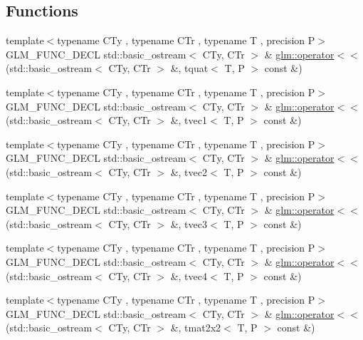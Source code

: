 \subsection*{Functions}
\begin{DoxyCompactItemize}
\item 
{\footnotesize template$<$typename C\+Ty , typename C\+Tr , typename T , precision P$>$ }\\G\+L\+M\+\_\+\+F\+U\+N\+C\+\_\+\+D\+E\+C\+L std\+::basic\+\_\+ostream$<$ C\+Ty, C\+Tr $>$ \& \hyperlink{group__gtx__io_ga038d37e8d7965dc7bfae5dc23e4140af}{glm\+::operator$<$$<$} (std\+::basic\+\_\+ostream$<$ C\+Ty, C\+Tr $>$ \&, tquat$<$ T, P $>$ const \&)
\item 
{\footnotesize template$<$typename C\+Ty , typename C\+Tr , typename T , precision P$>$ }\\G\+L\+M\+\_\+\+F\+U\+N\+C\+\_\+\+D\+E\+C\+L std\+::basic\+\_\+ostream$<$ C\+Ty, C\+Tr $>$ \& \hyperlink{group__gtx__io_ga171289d1671b75e033a1b078c68a7460}{glm\+::operator$<$$<$} (std\+::basic\+\_\+ostream$<$ C\+Ty, C\+Tr $>$ \&, tvec1$<$ T, P $>$ const \&)
\item 
{\footnotesize template$<$typename C\+Ty , typename C\+Tr , typename T , precision P$>$ }\\G\+L\+M\+\_\+\+F\+U\+N\+C\+\_\+\+D\+E\+C\+L std\+::basic\+\_\+ostream$<$ C\+Ty, C\+Tr $>$ \& \hyperlink{group__gtx__io_ga0a3bca262adbba991f394d8d3d52e10d}{glm\+::operator$<$$<$} (std\+::basic\+\_\+ostream$<$ C\+Ty, C\+Tr $>$ \&, tvec2$<$ T, P $>$ const \&)
\item 
{\footnotesize template$<$typename C\+Ty , typename C\+Tr , typename T , precision P$>$ }\\G\+L\+M\+\_\+\+F\+U\+N\+C\+\_\+\+D\+E\+C\+L std\+::basic\+\_\+ostream$<$ C\+Ty, C\+Tr $>$ \& \hyperlink{group__gtx__io_ga0d6cfb5d138639b90f18d7bbb2a4ae56}{glm\+::operator$<$$<$} (std\+::basic\+\_\+ostream$<$ C\+Ty, C\+Tr $>$ \&, tvec3$<$ T, P $>$ const \&)
\item 
{\footnotesize template$<$typename C\+Ty , typename C\+Tr , typename T , precision P$>$ }\\G\+L\+M\+\_\+\+F\+U\+N\+C\+\_\+\+D\+E\+C\+L std\+::basic\+\_\+ostream$<$ C\+Ty, C\+Tr $>$ \& \hyperlink{group__gtx__io_ga948ab426a879f24236d8978ee9b5fade}{glm\+::operator$<$$<$} (std\+::basic\+\_\+ostream$<$ C\+Ty, C\+Tr $>$ \&, tvec4$<$ T, P $>$ const \&)
\item 
{\footnotesize template$<$typename C\+Ty , typename C\+Tr , typename T , precision P$>$ }\\G\+L\+M\+\_\+\+F\+U\+N\+C\+\_\+\+D\+E\+C\+L std\+::basic\+\_\+ostream$<$ C\+Ty, C\+Tr $>$ \& \hyperlink{group__gtx__io_ga61fbdb6ad70c4c8d750a847251fa4a4a}{glm\+::operator$<$$<$} (std\+::basic\+\_\+ostream$<$ C\+Ty, C\+Tr $>$ \&, tmat2x2$<$ T, P $>$ const \&)

\end{DoxyCompactItemize}
